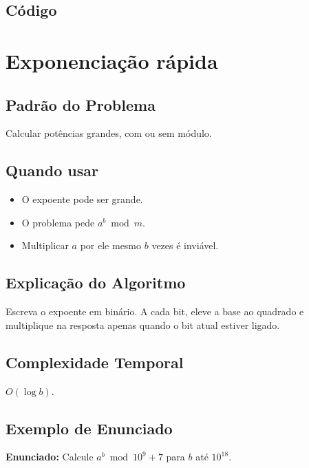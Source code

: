 \subsection{Código}

\section{Exponenciação rápida}

\subsection{Padrão do Problema}
Calcular potências grandes, com ou sem módulo.

\subsection{Quando usar}
\begin{itemize}[nosep]
  \item O expoente pode ser grande.
  \item O problema pede $a^b \bmod m$.
  \item Multiplicar $a$ por ele mesmo $b$ vezes é inviável.
\end{itemize}

\subsection{Explicação do Algoritmo}
Escreva o expoente em binário. A cada bit, eleve a base ao quadrado e multiplique na resposta apenas quando o bit atual estiver ligado.

\subsection{Complexidade Temporal}
$O(\log b)$.

\subsection{Exemplo de Enunciado}
\begin{exemplodiabox}
\textbf{Enunciado:} Calcule $a^b \bmod 10^9+7$ para $b$ até $10^{18}$.
\end{exemplodiabox}

